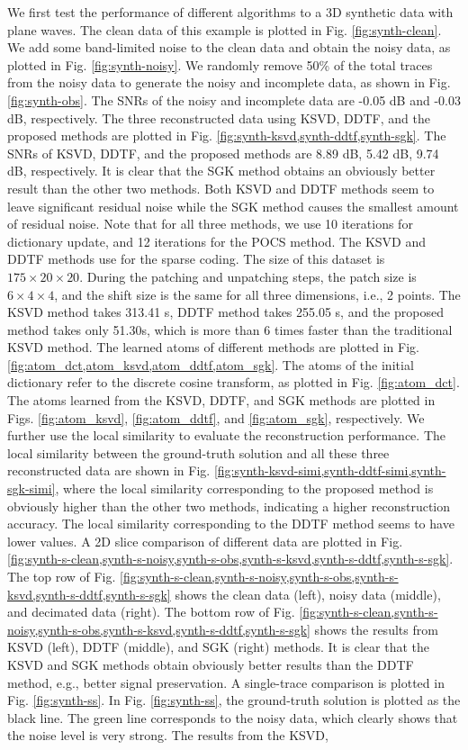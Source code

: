 We first test the performance of different algorithms to a 3D synthetic data with plane waves. The clean data of this example is plotted in Fig. \ref{fig:synth-clean}. We add some band-limited noise to the clean data and obtain the noisy data, as plotted in Fig. \ref{fig:synth-noisy}. We randomly remove 50\% of the total traces from the noisy data to generate the noisy and incomplete data, as shown in Fig. \ref{fig:synth-obs}. The SNRs of the noisy and incomplete data are -0.05 dB and -0.03 dB, respectively. The three reconstructed data using KSVD, DDTF, and the proposed methods are plotted in Fig. \ref{fig:synth-ksvd,synth-ddtf,synth-sgk}. The SNRs of KSVD, DDTF, and the proposed methods are 8.89 dB, 5.42 dB, 9.74 dB, respectively. It is clear that the SGK method obtains an obviously better result than the other two methods. Both KSVD and DDTF methods seem to leave significant residual noise while the SGK method causes the smallest amount of residual noise. Note that for all three methods, we use 10 iterations for dictionary update, and 12 iterations for the POCS method. The KSVD and DDTF methods use  for the sparse coding. The size of this dataset is $175\times 20\times20$. During the patching and unpatching steps, the patch size is $6\times 4\times 4$, and the shift size is the same for all three dimensions, i.e., 2 points. The KSVD method takes 313.41 s, DDTF method takes 255.05 s, and the proposed method takes only 51.30s, which is more than 6 times faster than the traditional KSVD method. The learned atoms of different methods are plotted in Fig. \ref{fig:atom_dct,atom_ksvd,atom_ddtf,atom_sgk}. The atoms of the initial dictionary refer to the discrete cosine transform, as plotted in Fig. \ref{fig:atom_dct}. The atoms learned from the KSVD, DDTF, and SGK methods are plotted in Figs. \ref{fig:atom_ksvd}, \ref{fig:atom_ddtf}, and \ref{fig:atom_sgk}, respectively. We further use the local similarity to evaluate the reconstruction performance. The local similarity between the ground-truth solution and all these three reconstructed data are shown in Fig. \ref{fig:synth-ksvd-simi,synth-ddtf-simi,synth-sgk-simi}, where the local similarity corresponding to the proposed method is obviously higher than the other two methods, indicating a higher reconstruction accuracy. The local similarity corresponding to the DDTF method seems to have lower values. A 2D slice comparison of different data are plotted in Fig. \ref{fig:synth-s-clean,synth-s-noisy,synth-s-obs,synth-s-ksvd,synth-s-ddtf,synth-s-sgk}.  The top row of Fig. \ref{fig:synth-s-clean,synth-s-noisy,synth-s-obs,synth-s-ksvd,synth-s-ddtf,synth-s-sgk} shows the clean data (left), noisy data (middle), and decimated data (right). The bottom row of Fig. \ref{fig:synth-s-clean,synth-s-noisy,synth-s-obs,synth-s-ksvd,synth-s-ddtf,synth-s-sgk} shows the results from KSVD (left), DDTF (middle), and SGK (right) methods. It is clear that the KSVD and SGK methods obtain obviously better results than the DDTF method, e.g., better signal preservation. A single-trace comparison is plotted in Fig. \ref{fig:synth-ss}. In Fig. \ref{fig:synth-ss}, the ground-truth solution is plotted as the black line. The green line corresponds to the noisy data, which clearly shows that the noise level is very strong. The results from the KSVD, 